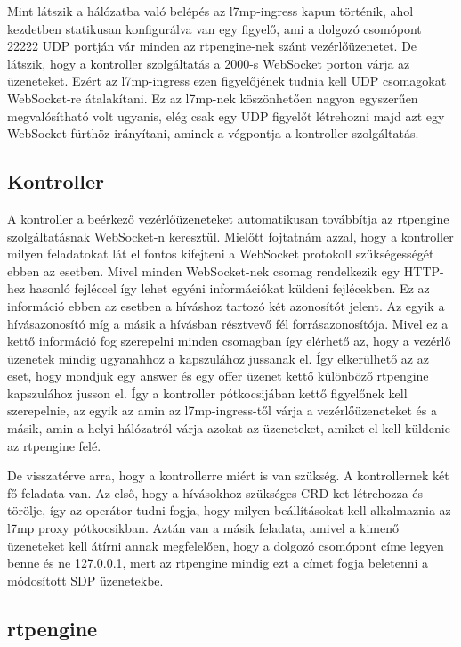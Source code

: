 Mint látszik a hálózatba való belépés az l7mp-ingress kapun történik, ahol kezdetben
statikusan konfigurálva van egy figyelő, ami a dolgozó csomópont 22222 UDP portján
vár minden az rtpengine-nek szánt vezérlőüzenetet. De látszik, hogy a kontroller szolgáltatás
a 2000-s WebSocket porton várja az üzeneteket. Ezért az l7mp-ingress ezen figyelőjének 
tudnia kell UDP csomagokat WebSocket-re átalakítani. Ez az l7mp-nek köszönhetően nagyon
egyszerűen megvalósítható volt ugyanis, elég csak egy UDP figyelőt létrehozni majd azt 
egy WebSocket fürthöz irányítani, aminek a végpontja a kontroller szolgáltatás. 


\subsection{Kontroller}
A kontroller a beérkező vezérlőüzeneteket automatikusan továbbítja az rtpengine 
szolgáltatásnak WebSocket-n keresztül. Mielőtt fojtatnám azzal, hogy a kontroller milyen 
feladatokat lát el fontos kifejteni a WebSocket protokoll szükségességét ebben az esetben.
Mivel minden WebSocket-nek  csomag rendelkezik egy HTTP-hez hasonló fejléccel így
lehet egyéni információkat küldeni fejlécekben. Ez az információ ebben az esetben a híváshoz
tartozó  két azonosítót jelent. Az egyik a hívásazonosító míg a másik a hívásban résztvevő
fél forrásazonosítója. Mivel ez a kettő információ fog szerepelni minden csomagban így elérhető az,
hogy a vezérlő üzenetek mindig ugyanahhoz a kapszulához jussanak el. Így elkerülhető az
az eset, hogy mondjuk egy answer és egy offer üzenet kettő különböző rtpengine kapszulához
jusson el. Így a kontroller pótkocsijában kettő figyelőnek kell szerepelnie, az egyik
az amin az l7mp-ingress-től várja a vezérlőüzeneteket és a másik, amin a helyi hálózatról
várja azokat az üzeneteket, amiket el kell küldenie az rtpengine felé. 

De visszatérve arra, hogy a kontrollerre miért is van szükség. A kontrollernek két fő feladata
van. Az első, hogy a hívásokhoz szükséges CRD-ket létrehozza és törölje, így az operátor tudni fogja,
hogy milyen beállításokat kell alkalmaznia az l7mp proxy pótkocsikban. Aztán van a másik feladata,
amivel a kimenő üzeneteket kell átírni annak megfelelően, hogy a dolgozó csomópont
címe legyen benne és ne 127.0.0.1, mert az rtpengine mindig ezt a címet fogja beletenni
a módosított SDP üzenetekbe. 

\subsection{rtpengine}

